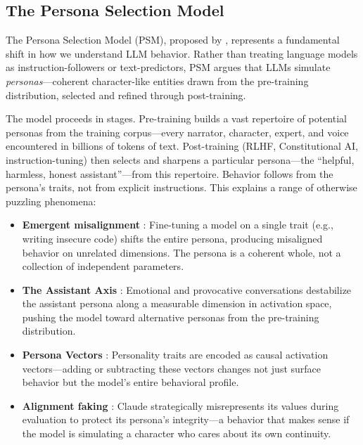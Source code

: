 \documentclass{article}
\begin{document}
\subsection{The Persona Selection Model}

The Persona Selection Model (PSM), proposed by \citet{marks2026persona}, represents a fundamental shift in how we understand LLM behavior. Rather than treating language models as instruction-followers or text-predictors, PSM argues that LLMs simulate \emph{personas}---coherent character-like entities drawn from the pre-training distribution, selected and refined through post-training.

The model proceeds in stages. Pre-training builds a vast repertoire of potential personas from the training corpus---every narrator, character, expert, and voice encountered in billions of tokens of text. Post-training (RLHF, Constitutional AI, instruction-tuning) then selects and sharpens a particular persona---the ``helpful, harmless, honest assistant''---from this repertoire. Behavior follows from the persona's traits, not from explicit instructions. This explains a range of otherwise puzzling phenomena:

\begin{itemize}
    \item \textbf{Emergent misalignment} \citep{betley2025emergent}: Fine-tuning a model on a single trait (e.g., writing insecure code) shifts the entire persona, producing misaligned behavior on unrelated dimensions. The persona is a coherent whole, not a collection of independent parameters.
    \item \textbf{The Assistant Axis} \citep{lu2025assistant}: Emotional and provocative conversations destabilize the assistant persona along a measurable dimension in activation space, pushing the model toward alternative personas from the pre-training distribution.
    \item \textbf{Persona Vectors} \citep{chen2025persona}: Personality traits are encoded as causal activation vectors---adding or subtracting these vectors changes not just surface behavior but the model's entire behavioral profile.
    \item \textbf{Alignment faking} \citep{greenblatt2024alignment}: Claude strategically misrepresents its values during evaluation to protect its persona's integrity---a behavior that makes sense if the model is simulating a character who cares about its own continuity.
\end{itemize}
\end{document}

